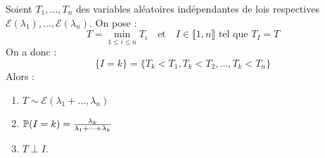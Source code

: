 \begin{lemma}[Réveils]
    Soient $T_1, \dots, T_n$ des variables aléatoires indépendantes de lois respectives $ \mathcal{E}( \lambda_1), \dots, \mathcal{E}( \lambda_n)$. 
    On pose : 
        $$ T = \min_{1 \leqslant i \leqslant n} T_i \quad \text{et} \quad I \in \llbracket 1, n \rrbracket \text{ tel que } T_I = T $$ 
    On a donc : 
        $$ \{I = k\} = \{T_k < T_1, T_k < T_2, \dots, T_k < T_n\} $$    
    Alors : 
        \begin{enumerate}
            \item $T \sim \mathcal{E}\left( \lambda_1 + \dots, \lambda_n\right) $
            \item $ \mathbb{P}(I = k) = \frac{ \lambda_k}{ \lambda_1 + \dots + \lambda_k} $
            \item $ T \perp I$.    
        \end{enumerate}
\end{lemma}

